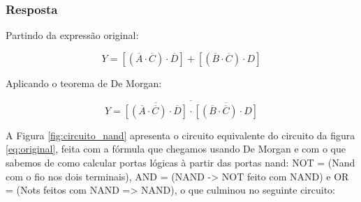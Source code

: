 \documentclass[12pt]{article}
\begin{document}
\subsubsection*{Resposta}

Partindo da expressão original:

\begin{equation}
Y = [(\overline{A}\cdot\overline{C}) \cdot \overline{D}] + [(\overline{B}\cdot\overline{C}) \cdot D]
\end{equation}

Aplicando o teorema de De Morgan:

\begin{equation}
Y=
\overline{
\overline{[(\overline{A}\cdot\overline{C})\cdot\overline{D}]}
\cdot
\overline{[(\overline{B}\cdot\overline{C})\cdot D]}
}
\end{equation}

A Figura \ref{fig:circuito_nand} apresenta o circuito equivalente do circuito da figura \ref{eq:original}, feita com a fórmula que chegamos usando De Morgan e com o que sabemos de como calcular portas lógicas à partir das portas nand: NOT = (Nand com o fio nos dois terminais), AND = (NAND -> NOT feito com NAND) e OR = (Nots feitos com NAND => NAND), o que culminou no seguinte circuito:
\end{document}
